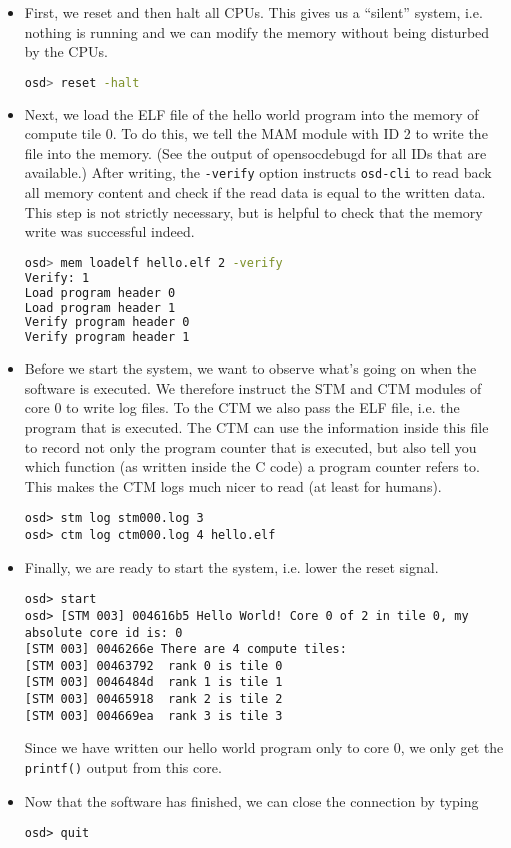 \begin{itemize}
\item First, we reset and then halt all CPUs.
  This gives us a ``silent'' system, i.e. nothing is running and we can modify the memory without being disturbed by the CPUs.
\begin{lstlisting}[language=sh]
osd> reset -halt
\end{lstlisting}

\item Next, we load the ELF file of the hello world program into the memory of compute tile 0.
  To do this, we tell the MAM module with ID 2 to write the file into the memory. (See the output of opensocdebugd for all IDs that are available.)
  After writing, the \verb|-verify| option instructs \verb|osd-cli| to read back all memory content and check if the read data is equal to the written data.
  This step is not strictly necessary, but is helpful to check that the memory write was successful indeed.
\begin{lstlisting}[language=sh]
osd> mem loadelf hello.elf 2 -verify
Verify: 1
Load program header 0
Load program header 1
Verify program header 0
Verify program header 1
\end{lstlisting}

\item Before we start the system, we want to observe what's going on when the software is executed.
  We therefore instruct the STM and CTM modules of core 0 to write log files.
  To the CTM we also pass the ELF file, i.e. the program that is executed.
  The CTM can use the information inside this file to record not only the program counter that is executed, but also tell you which function (as written inside the C code) a program counter refers to.
  This makes the CTM logs much nicer to read (at least for humans).

\begin{lstlisting}
osd> stm log stm000.log 3
osd> ctm log ctm000.log 4 hello.elf
\end{lstlisting}

\item Finally, we are ready to start the system, i.e. lower the reset signal.
\begin{lstlisting}
osd> start
osd> [STM 003] 004616b5 Hello World! Core 0 of 2 in tile 0, my absolute core id is: 0
[STM 003] 0046266e There are 4 compute tiles:
[STM 003] 00463792  rank 0 is tile 0
[STM 003] 0046484d  rank 1 is tile 1
[STM 003] 00465918  rank 2 is tile 2
[STM 003] 004669ea  rank 3 is tile 3
\end{lstlisting}

Since we have written our hello world program only to core 0, we only get the \verb|printf()| output from this core.

\item Now that the software has finished, we can close the connection by typing
\begin{lstlisting}
osd> quit
\end{lstlisting}
\end{itemize}

